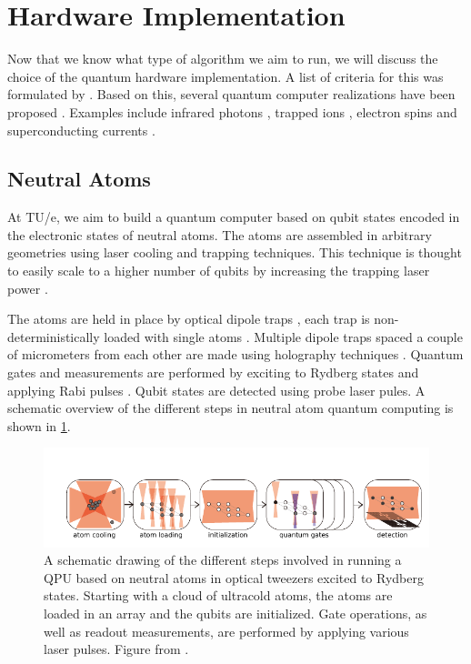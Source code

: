 \section{Hardware Implementation}

Now that we know what type of algorithm we aim to run, we will discuss the choice of the quantum hardware implementation. A list of criteria for this was formulated by \cite{DiVincenzo2000}. Based on this, several quantum computer realizations have been proposed \cite{Ladd2010}. Examples include infrared photons \cite{Matthews2009},  trapped ions \cite{Benhelm2008,Schindler2013}, electron spins \cite{Press2008} and superconducting currents \cite{DiCarlo2009,Arute2019}. 

\subsection{Neutral Atoms}

At TU/e, we aim to build a quantum computer based on qubit states encoded in the electronic states of neutral atoms. The atoms are assembled in arbitrary geometries using laser cooling and trapping techniques. This technique is thought to easily scale to a higher number of qubits by increasing the trapping laser power \cite{Henriet2020}. 

The atoms are held in place by optical dipole traps \cite{Chu1986}, each trap is non-deterministically loaded with single atoms \cite{Schlosser2001}. Multiple dipole traps spaced a couple of micrometers from each other are made using holography techniques \cite{Bergamini2004}. Quantum gates and measurements are performed by exciting to Rydberg states and applying Rabi pulses \cite{Levine2018,Madjarov2020}. Qubit states are detected using probe laser pules. A schematic overview of the different steps in neutral atom quantum computing is shown in \cref{fig:ComputingSteps}.

\begin{figure}[b]
	\centering
	\includegraphics[width=\linewidth]{figures/ComputingSteps.pdf}
	\caption{A schematic drawing of the different steps involved in running a QPU based on neutral atoms in optical tweezers excited to Rydberg states. Starting with a cloud of ultracold atoms, the atoms are loaded in an array and the qubits are initialized. Gate operations, as well as readout measurements, are performed by applying various laser pulses. Figure from \cite{Wu2021}.}
	\label{fig:ComputingSteps}
\end{figure}

